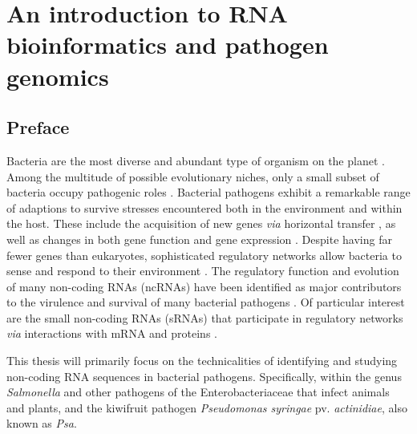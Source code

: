 \chapter{An introduction to RNA bioinformatics and pathogen genomics}
\label{chap:intro}
\section{Preface}
Bacteria are the most diverse and abundant type of organism on the planet \citep{Hug2016-nr}. Among the multitude of possible evolutionary niches, only a small subset of bacteria occupy pathogenic roles \citep{noauthor_2011-sb,Balloux2017}. Bacterial pathogens exhibit a remarkable range of adaptions to survive stresses encountered both in the environment and within the host. These include the acquisition of new genes \textit{via} horizontal transfer \citep{Kado2009-eh,Groisman1996-fv}, as well as changes in both gene function \citep{Moxon1994-oe} and gene expression \citep{Thomas2014-ln}.
Despite having far fewer genes than eukaryotes, sophisticated regulatory networks allow bacteria to sense and respond to their environment \citep{Dorman2018-dv}. The regulatory function and evolution of many non-coding RNAs (ncRNAs) have been identified as major contributors to the virulence and survival of many bacterial pathogens \citep{Gottesman2005-cp,Gripenland2010-rm}. Of particular interest are the small non-coding RNAs (sRNAs) that participate in regulatory networks \textit{via} interactions with mRNA and proteins \citep{Gottesman2011-vx}.\par

This thesis will primarily focus on the technicalities of identifying and studying non-coding RNA sequences in bacterial pathogens. Specifically, within the genus \textit{Salmonella} and other pathogens of the Enterobacteriaceae that infect animals and plants, and the kiwifruit pathogen \textit{Pseudomonas syringae} pv. \textit{actinidiae}, also known as \textit{Psa}.\par

